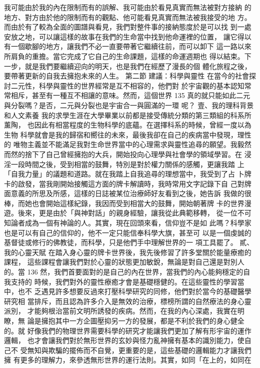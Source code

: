 我可能由於我的內在限制而有的誤解、我可能由於看見真實而無法被對方接納
的地方、對方由於他的限制而有的觀點、他可能看見真實而無法被我接受的地
方。而由於有了較為全面的圖譜與看見，我們對整件事的接納態度於是可以找
到一處安放之地，可以讓這樣的故事在我們的生命當中找到他命運裡的位置，
讓它得以有一個歇腳的地方，讓我們不必一直要帶著它繼續往前，而可以卸下
這一路以來所肩負的重擔。當它完成了它自己的生命課題，這樣的命運週期也
得以結束。下一步，就是我們要繼續迎向的明天，也是我們在經歷了漫長的個
體化旅程之後，要帶著更新的自我去擁抱未來的人生。 
第二節 建議：科學與靈性 
在當今的社會探討二元性，科學與靈性的世界經常是互不相容的，他們對
於宇宙觀的基本認知常常相斥，甚至有一種互不相讓的意味。然而，這個世界
135 
真的就只能如此二元與分裂嗎？是否，二元與分裂也是宇宙合一與圓滿的一環
呢？ 
壹、我的理科背景和人文素養 
我的求學生涯在大學畢業以前都是接受傳統分類的第三類組的科系所薰陶，
也因此有相當程度的生物科學的底蘊。在選擇科系的時候，曾經一度以為生物
科學就會是我的歸宿和嚮往的未來，最後我卻在自己的疾病當中發現，理性的
唯物主義並不能滿足我對生命世界當中的心理需求與靈性追尋的願望。我毅然
而然的捨下了自己曾經擁抱的大兵，開始投向心理學與社會學的領域學習。在
浸淫一段時間之後，受到相當的鼓舞，特別是對於權力關係的感觸，更讓我踏
上「自我力量」的議題和道路。就在我踏上自我追尋的理想當中，我受到了占
卜牌卡的啟發，當我剛開始接觸這方面的牌卡解讀時，我時常用文字記錄下自
己對牌面意義的所思及所感，這樣的日誌被某位治療師好友看到之後，她告訴
我做的很棒，而她也會開始這樣紀錄，我因而受到相當大的鼓舞，開始朝著牌
卡的世界漫遊。後來，更是由於「與神對話」的親身經驗，讓我從此典範移轉，
從一位不可知論者成為一個有神論的人。其實，現在回頭來看，信仰豈不是如
此嗎？科學家也是可以有自己的信仰的，他不一定只能信奉科學大旗，甚至可
以是一個虔誠的基督徒或修行的佛教徒，而科學，只是他們手中理解世界的一
項工具罷了。 
貳、我的心靈天賦 
在踏入身心靈的牌卡世界後，我先後修習了許多堂關於能量療癒的課程，
這些課程會讓我們對於心靈的狀態更加敏銳，無論是對自己還是對別人的。當
136 
然，我們首要面對的是自己的內在世界，當我們的內心能夠穩定的自我支持的
時候，我們對外的靈性療癒才會是基礎穩健的。在這些靈性的學習當中，也不
乏遇見許多想要反過來打壓科學研究的同修，他們對於當今的基礎醫學研究相
當排斥，而且認為許多介入是無效的治療，標榜所謂的自然療法的身心靈派別，
才能夠根治當前文明所誘發的疾病。然而，在我的內心深處，我實在明瞭，無
論是擁抱其中一方企圖壓抑另一方的發展，都是不利於我們的身心健全的。就
好像我們的物理世界需要科學的研究才能讓我們更加了解有形宇宙的運作邏輯，
也才會讓我們對於無形世界的玄妙與怪力亂神擁有基本的識別能力，使自己不
受無知與欺騙的擺佈而不自覺，更重要的是，這些基礎的邏輯能力才讓我們擁
有更多的理解力，來參透無形世界的運行法則。其實，如同「在上的，如同在
